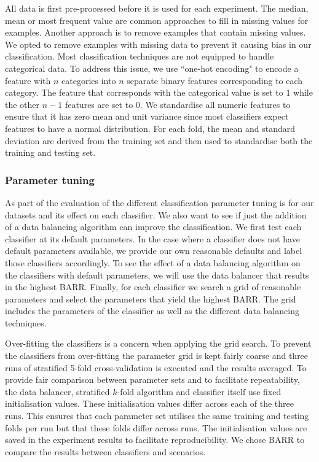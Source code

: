 \documentclass{sig-alternate-05-2015}
\begin{document}
	All data is first pre-processed before it is used for each experiment. The median, mean or most frequent value are common approaches to fill in  missing values for examples. Another approach is to remove examples that contain missing values. We opted to remove examples with missing data to prevent it  causing bias in our classification. Most classification techniques are not equipped to handle categorical data. To address this issue, we use ``one-hot encoding" to encode a feature with $n$ categories into $n$ separate binary features corresponding to each category. The feature that corresponds with the categorical value is set to 1 while the other $n-1$ features are set to 0. We standardise all numeric features to ensure that it has zero mean and unit variance since most classifiers expect features to have a normal distribution. For each fold, the mean and standard deviation are derived from the training set and then used to standardise both the training and testing set. 
	
	\subsubsection{Parameter tuning}
	\label{parameter_tuning}
	As part of the evaluation of the different classification  parameter tuning is for our datasets and its effect on each classifier. We also want to see if just the addition of a data balancing algorithm can improve the classification. We first test each classifier at its default parameters. In the case where a classifier does not have default parameters available, we provide our own reasonable defaults and label those classifiers accordingly. To see the effect of a data balancing algorithm on the classifiers with default parameters, we will use the data balancer that results in the highest BARR. Finally, for each classifier we search a grid of reasonable parameters and select the parameters that yield the highest BARR. The grid includes the parameters of the classifier as well as the different data balancing techniques.
	
	Over-fitting the classifiers is a concern when applying the grid search. To prevent the classifiers from over-fitting the parameter grid is kept fairly coarse and three runs of stratified 5-fold cross-validation is executed and the results averaged. To provide fair comparison between parameter sets and to facilitate repeatability, the data balancer, stratified $k$-fold algorithm and classifier itself use fixed initialisation values. These initialisation values differ across each of the three runs. This ensures that each parameter set utilises the same training and testing folds per run but that these folds differ across runs. The initialisation values are saved in the experiment results to facilitate reproducibility. We chose BARR to compare the results between classifiers and scenarios.	
	
\end{document}
